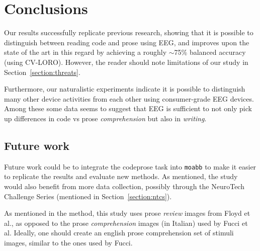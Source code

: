 \chapter{Conclusions}

Our results successfully replicate previous research, showing that it is possible to distinguish between reading code and prose using EEG, and improves upon the state of the art in this regard by achieving a roughly $\sim$75\% balanced accuracy (using CV-LORO). However, the reader should note limitations of our study in Section~\ref{section:threats}.

Furthermore, our naturalistic experiments indicate it is possible to distinguish many other device activities from each other using consumer-grade EEG devices. Among these some data seems to suggest that EEG is sufficient to not only pick up differences in code vs prose \emph{comprehension} but also in \emph{writing}.

\section{Future work}

Future work could be to integrate the codeprose task into \texttt{moabb} to make it easier to replicate the results and evaluate new methods. As mentioned, the study would also benefit from more data collection, possibly through the NeuroTech Challenge Series (mentioned in Section~\ref{section:ntcs}).

As mentioned in the method, this study uses prose \emph{review} images from Floyd et al., as opposed to the prose \emph{comprehension} images (in Italian) used by Fucci et al. Ideally, one should create an english prose comprehension set of stimuli images, similar to the ones used by Fucci.
